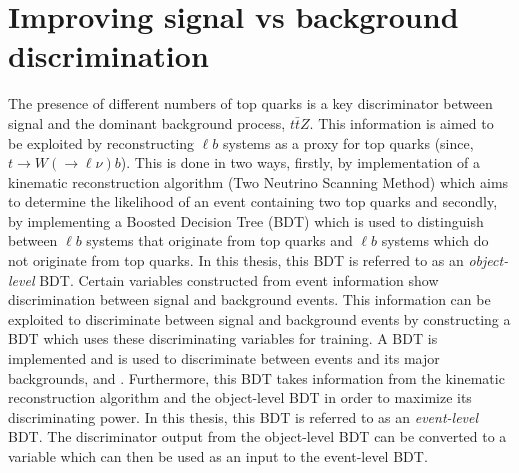 \section{Improving signal vs background discrimination}
The presence of different numbers of top quarks is a key discriminator between signal and the dominant background process, $t\bar{t}Z$. This information is aimed to be exploited by reconstructing $\ell b$ systems as a proxy for top quarks (since, $t\rightarrow W(\rightarrow \ell \nu) b$). This is done in two ways, firstly, by implementation of a kinematic reconstruction algorithm (Two Neutrino Scanning Method) which aims to determine the likelihood of an event containing two top quarks and secondly, by implementing a Boosted Decision Tree (BDT) which is used to distinguish between $\ell b$ systems that originate from top quarks and $\ell b$ systems which do not originate from top quarks. In this thesis, this BDT is referred to as an \textit{object-level} BDT. Certain variables constructed from event information show discrimination between signal and background events. This information can be exploited to discriminate between signal and background events by constructing a BDT which uses these discriminating variables for training. A BDT is implemented and is used to discriminate between \tWZ events and its major backgrounds, \ttZ and \ZZ. Furthermore, this BDT takes information from the kinematic reconstruction algorithm and the object-level BDT in order to maximize its discriminating power. In this thesis, this BDT is referred to as an \textit{event-level} BDT. The discriminator output from the object-level BDT can be converted to a variable which can then be used as an input to the event-level BDT.
